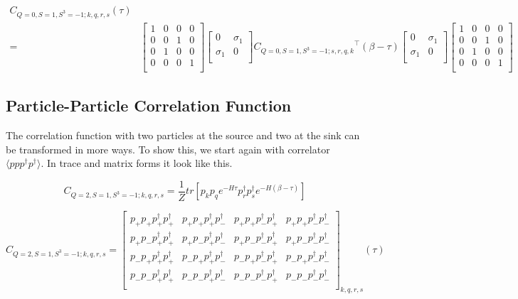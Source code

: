 \begin{equation}
  \begin{aligned}
    C_{Q=0,S=1,S^3=-1;k,q,r,s} (\tau) \\
    =& \left[ {\begin{array}{cccc}
      1 & 0 & 0 & 0 \\
      0 & 0 & 1 & 0 \\
      0 & 1 & 0 & 0 \\
      0 & 0 & 0 & 1 \\
    \end{array} } \right]
    \left[ {\begin{array}{cc}
      0 & \sigma_1 \\
      \sigma_1 & 0 \\
    \end{array} } \right]
    {C_{Q=0,S=1,S^3=-1;s,r,q,k}}^\top (\beta-\tau)
    \left[ {\begin{array}{cc}
      0 & \sigma_1 \\
      \sigma_1 & 0 \\
    \end{array} } \right]
    \left[ {\begin{array}{cccc}
      1 & 0 & 0 & 0 \\
      0 & 0 & 1 & 0 \\
      0 & 1 & 0 & 0 \\
      0 & 0 & 0 & 1 \\
    \end{array} } \right]
  \end{aligned}
\end{equation}

\subsection{Particle-Particle Correlation Function}

The correlation function with two particles at the source and two at the sink can be transformed in more ways. To show this, we start again with correlator $\langle ppp^\dagger p^\dagger\rangle$. In trace and matrix forms it look like this.

\begin{equation}
  C_{Q=2,S=1,S^3=-1;k,q,r,s} = \frac{1}{Z}tr\left[p_kp_qe^{-H\tau}p^\dagger_rp^\dagger_se^{-H\left(\beta-\tau\right)}\right]
\end{equation}

\renewcommand{\cor}[4]{p_{#1}p_{#2}p^\dagger_{#3}p^\dagger_{#4}}
\begin{equation}
  C_{Q=2,S=1,S^3=-1;k,q,r,s} =
  \left[
  \begin{array}{cccc}
    \cor{+}{+}{+}{+} & \cor{+}{+}{+}{-} & \cor{+}{+}{-}{+} & \cor{+}{+}{-}{-} \\
    \cor{+}{-}{+}{+} & \cor{+}{-}{+}{-} & \cor{+}{-}{-}{+} & \cor{+}{-}{-}{-} \\
    \cor{-}{+}{+}{+} & \cor{-}{+}{+}{-} & \cor{-}{+}{-}{+} & \cor{-}{+}{-}{-} \\
    \cor{-}{-}{+}{+} & \cor{-}{-}{+}{-} & \cor{-}{-}{-}{+} & \cor{-}{-}{-}{-} \\
  \end{array}
  \right]_{k,q,r,s} (\tau)
\end{equation}

